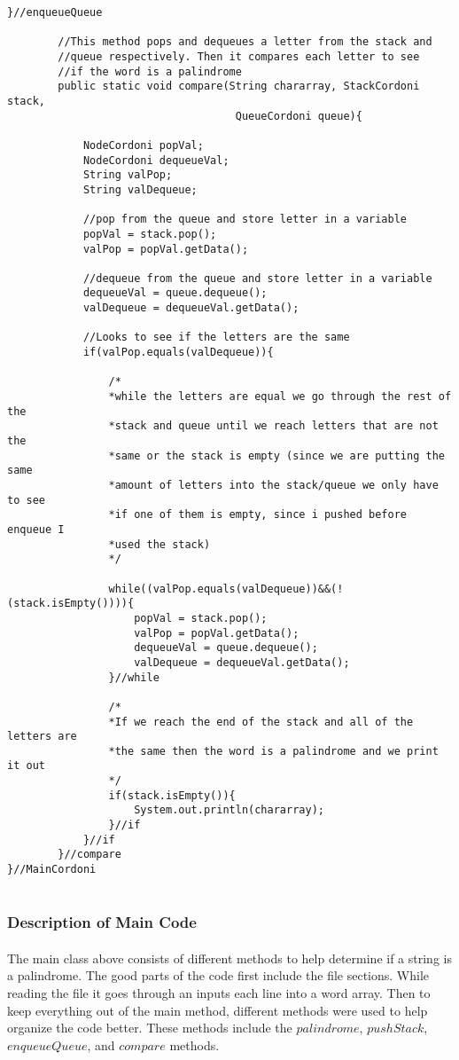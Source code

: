 \documentclass[letterpaper, 10pt,DIV=13]{scrartcl}
\numberwithin{equation}{section} %
\numberwithin{figure}{section} %
\numberwithin{table}{section} %
\begin{document}
\begin{lstlisting}[frame=single, ]
		}//enqueueQueue

		//This method pops and dequeues a letter from the stack and 
		//queue respectively. Then it compares each letter to see 
		//if the word is a palindrome
		public static void compare(String chararray, StackCordoni stack,
		                            QueueCordoni queue){

			NodeCordoni popVal;
			NodeCordoni dequeueVal;
			String valPop;
			String valDequeue;

			//pop from the queue and store letter in a variable
			popVal = stack.pop();
			valPop = popVal.getData();

			//dequeue from the queue and store letter in a variable
			dequeueVal = queue.dequeue();
			valDequeue = dequeueVal.getData();

			//Looks to see if the letters are the same
			if(valPop.equals(valDequeue)){

				/*
				*while the letters are equal we go through the rest of the
				*stack and queue until we reach letters that are not the 
				*same or the stack is empty (since we are putting the same
				*amount of letters into the stack/queue we only have to see 
				*if one of them is empty, since i pushed before enqueue I 
				*used the stack)
				*/

				while((valPop.equals(valDequeue))&&(!(stack.isEmpty()))){
					popVal = stack.pop();
					valPop = popVal.getData();
					dequeueVal = queue.dequeue();
					valDequeue = dequeueVal.getData();
				}//while
				
				/*
				*If we reach the end of the stack and all of the letters are
				*the same then the word is a palindrome and we print it out
				*/
				if(stack.isEmpty()){
					System.out.println(chararray);
				}//if	
			}//if
		}//compare
}//MainCordoni


\end{lstlisting}

\subsubsection{Description of Main Code}
\paragraph{} The main class above consists of different methods to help determine if a string is a palindrome. The good parts of the code first include the file sections. While reading the file it goes through an inputs each line into a word array. Then to keep everything out of the main method, different methods were used to help organize the code better. These methods include the $palindrome$, $pushStack$, $enqueueQueue$, and $compare$ methods. 
\end{document}
